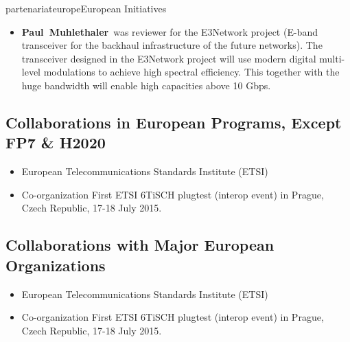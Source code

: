 \documentclass{ra2016}
\newcommand{\paul}  {\textbf{Paul~Muhlethaler}}
\begin{document}
\begin{module}{partenariat}{europe}{European Initiatives}
\begin{itemize}
    \item \paul~was reviewer for the E3Network project  (E-band transceiver for the backhaul infrastructure of the future networks). The transceiver designed in the E3Network project will use modern digital multi-level modulations to achieve high spectral efficiency. This together with the huge bandwidth will enable high capacities above 10 Gbps.
\end{itemize}




\subsection{Collaborations in European Programs, Except FP7 \& H2020}
\begin{itemize}
    \item European Telecommunications Standards Institute (ETSI)
    \item Co-organization First ETSI 6TiSCH plugtest (interop event) in Prague, Czech Republic, 17-18 July 2015.
\end{itemize}


\subsection{Collaborations with Major European Organizations}
\begin{itemize}
    \item European Telecommunications Standards Institute (ETSI)
    \item Co-organization First ETSI 6TiSCH plugtest (interop event) in Prague, Czech Republic, 17-18 July 2015.
\end{itemize}


\end{module}
\end{document}
